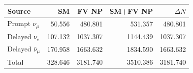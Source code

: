 \begin{tabular}{lrrrr}
\hline
Source & SM & FV NP & SM+FV NP & $\Delta N$ \\
\hline
Prompt $\nu_\mu$ & 50.556 & 480.801 & 531.357 & 480.801 \\
Delayed $\nu_e$ & 107.132 & 1037.307 & 1144.439 & 1037.307 \\
Delayed $\bar\nu_\mu$ & 170.958 & 1663.632 & 1834.590 & 1663.632 \\
Total & 328.646 & 3181.740 & 3510.386 & 3181.740 \\
\hline
\end{tabular}
